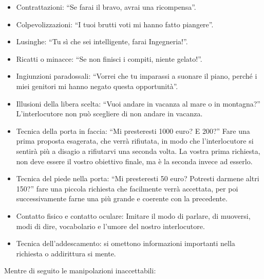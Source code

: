 \documentclass[12pt]{book} %
\begin{document}
\begin{itemize}
\item Contrattazioni: “Se farai il bravo, avrai una ricompensa”. 
\item Colpevolizzazioni: “I tuoi brutti voti mi hanno fatto piangere”. 
\item Lusinghe: “Tu sì che sei intelligente, farai Ingegneria!”. 
\item Ricatti o minacce: “Se non finisci i compiti, niente gelato!”. 
\item Ingiunzioni paradossali: “Vorrei che tu imparassi a suonare il piano, perché i miei genitori mi hanno negato questa opportunità”. 
\item Illusioni della libera scelta: “Vuoi andare in vacanza al mare o in montagna?”
L'interlocutore non può scegliere di non andare in vacanza.
\item Tecnica della porta in faccia: “Mi presteresti 1000 euro? E 200?” Fare una prima proposta esagerata, che verrà
rifiutata, in modo che l'interlocutore si sentirà più a disagio a rifiutarvi una seconda volta. La
vostra prima richiesta, non deve essere il vostro obiettivo finale, ma è la seconda invece ad esserlo.
\item Tecnica del piede nella porta: “Mi presteresti 50 euro? Potresti darmene altri 150?” fare una piccola richiesta
che facilmente verrà accettata, per poi successivamente farne una più grande e coerente con la precedente.
\item Contatto fisico e contatto oculare: Imitare il modo di parlare, di muoversi, modi di dire, vocabolario e l'umore del nostro interlocutore.
\item Tecnica dell'addescamento: si omettono informazioni importanti nella richiesta o addirittura si mente.
\end{itemize}

\bigskip

Mentre di seguito le manipolazioni inaccettabili:
\end{document}
